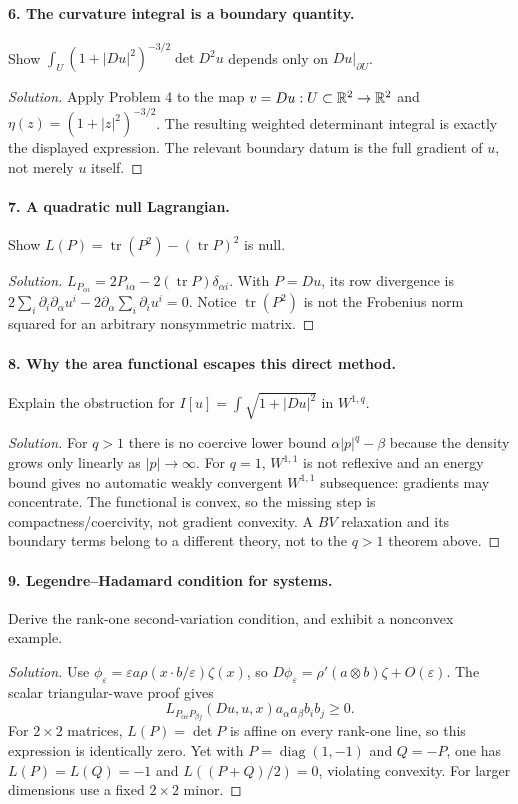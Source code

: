 \Needspace{30mm}
\paragraph{6. The curvature integral is a boundary quantity.}
Show $\int_U(1+|Du|^2)^{-3/2}\det D^2u$ depends only on $Du|_{\partial U}$.
\begin{proof}[Solution]
Apply Problem 4 to the map $v=Du:U\subset\mathbb{R}^2\to\mathbb{R}^2$ and
$\eta(z)=(1+|z|^2)^{-3/2}$. The resulting weighted determinant integral
is exactly the displayed expression. The relevant boundary datum is the
full gradient of $u$, not merely $u$ itself.
\end{proof}

\Needspace{30mm}
\paragraph{7. A quadratic null Lagrangian.}
Show $L(P)=\operatorname{tr}(P^2)-(\operatorname{tr}P)^2$ is null.
\begin{proof}[Solution]
$L_{P_{\alpha i}}=2P_{i\alpha}-2(\operatorname{tr}P)\delta_{\alpha i}$.
With $P=Du$, its row divergence is
$2\sum_i\partial_i\partial_\alpha u^i
-2\partial_\alpha\sum_i\partial_i u^i=0$.
Notice $\operatorname{tr}(P^2)$ is not the Frobenius norm squared for
an arbitrary nonsymmetric matrix.
\end{proof}

\Needspace{30mm}
\paragraph{8. Why the area functional escapes this direct method.}
Explain the obstruction for $I[u]=\int\sqrt{1+|Du|^2}$ in $W^{1,q}$.
\begin{proof}[Solution]
For $q>1$ there is no coercive lower bound $\alpha|p|^q-\beta$ because
the density grows only linearly as $|p|\to\infty$.
For $q=1$, $W^{1,1}$ is not reflexive and an energy bound gives no
automatic weakly convergent $W^{1,1}$ subsequence: gradients may concentrate.
The functional is convex, so the missing step is compactness/coercivity,
not gradient convexity. A $BV$ relaxation and its boundary terms belong
to a different theory, not to the $q>1$ theorem above.
\end{proof}

\Needspace{30mm}
\paragraph{9. Legendre--Hadamard condition for systems.}
Derive the rank-one second-variation condition, and exhibit a nonconvex example.
\begin{proof}[Solution]
Use $\phi_\varepsilon=\varepsilon a\rho(x\cdot b/\varepsilon)\zeta(x)$,
so $D\phi_\varepsilon=\rho'(a\otimes b)\zeta+O(\varepsilon)$.
The scalar triangular-wave proof gives
\[
 L_{P_{\alpha i}P_{\beta j}}(Du,u,x)a_\alpha a_\beta b_i b_j\geq0.
\]
For $2\times2$ matrices, $L(P)=\det P$ is affine on every rank-one line,
so this expression is identically zero. Yet with
$P=\operatorname{diag}(1,-1)$ and $Q=-P$, one has
$L(P)=L(Q)=-1$ and $L((P+Q)/2)=0$, violating convexity.
For larger dimensions use a fixed $2\times2$ minor.
\end{proof}

